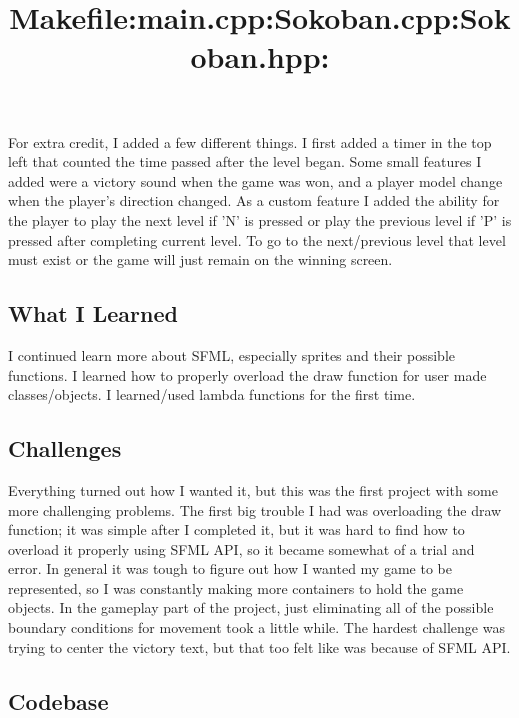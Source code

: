 \bigskip
For extra credit, I added a few different things.
I first added a timer in the top left that counted the time passed after the level began.
Some small features I added were a victory sound when the game was won, and a player model change when the player's direction changed.
As a custom feature I added the ability for the player to play the next level if 'N' is pressed or play the previous level if 'P' is pressed after completing current level.
To go to the next/previous level that level must exist or the game will just remain on the winning screen.

\subsection{What I Learned}\label{sec:ps2:learned} %

I continued learn more about SFML, especially sprites and their possible functions.
I learned how to properly overload the draw function for user made classes/objects.
I learned/used lambda functions for the first time.

\subsection{Challenges}\label{sec:ps2:challenges} %

Everything turned out how I wanted it, but this was the first project with some more challenging problems.
The first big trouble I had was overloading the draw function;
it was simple after I completed it, but it was hard to find how to overload it properly using SFML API, so it became somewhat of a trial and error.
In general it was tough to figure out how I wanted my game to be represented, so I was constantly making more containers to hold the game objects.
In the gameplay part of the project, just eliminating all of the possible boundary conditions for movement took a little while.
The hardest challenge was trying to center the victory text, but  that too felt like was because of SFML API.

\newpage
\subsection{Codebase}\label{sec:ps2:code} %

\bigskip
\title{\large Makefile:}

\bigskip
\title{\large main.cpp:}

\bigskip
\title{\large Sokoban.cpp:}

\bigskip
\title{\large Sokoban.hpp:}


\newpage
